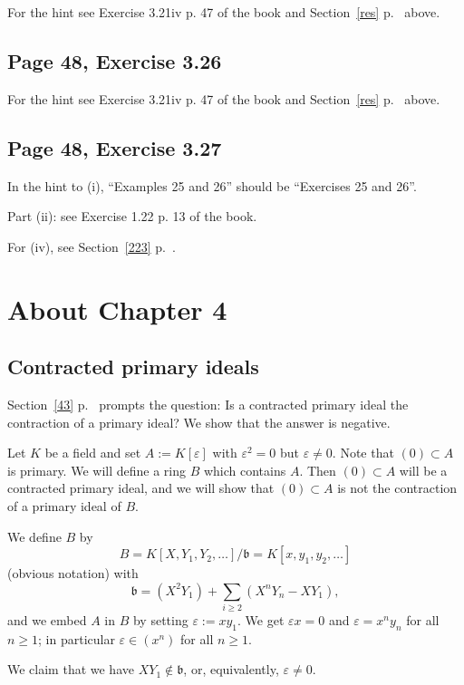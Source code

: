 \documentclass[parskip=half,fontsize=12pt]{scrartcl}%
\begin{document}
For the hint see Exercise 3.21iv p. 47 of the book and Section~\ref{res} p.~\pageref{res} above.

\subsection{Page 48, Exercise 3.26}%

For the hint see Exercise 3.21iv p. 47 of the book and Section~\ref{res} p.~\pageref{res} above.

\subsection{Page 48, Exercise 3.27}%

In the hint to (i), ``Examples 25 and 26'' should be ``Exercises 25 and 26''. 

Part (ii): see Exercise 1.22 p. 13 of the book. 

For (iv), see Section~\ref{223} p.~\pageref{223}.

\section{About Chapter 4}%

\subsection{Contracted primary ideals}\label{cpi}%

Section~\ref{43} p.~\pageref{43} prompts the question: Is a contracted primary ideal the contraction of a primary ideal? We show that the answer is negative.

Let $K$ be a field and set $A:=K[\varepsilon]$ with $\varepsilon^2=0$ but $\varepsilon\ne0$. Note that $(0)\subset A$ is primary. We will define a ring $B$ which contains $A$. Then $(0)\subset A$ will be a contracted primary ideal, and we will show that $(0)\subset A$ is not the contraction of a primary ideal of $B$. 

We define $B$ by 
$$
B=K[X,Y_1,Y_2,\dots]/\mathfrak b=K[x,y_1,y_2,\dots]
$$ 
(obvious notation) with 
$$
\mathfrak b=(X^2Y_1)+\sum_{i\ge2}(X^nY_n-XY_1),
$$
and we embed $A$ in $B$ by setting $\varepsilon:=xy_1$. We get $\varepsilon x=0$ and $\varepsilon=x^ny_n$ for all $n\ge1$; in particular $\varepsilon\in(x^n)$ for all $n\ge1$.

We claim that we have $XY_1\notin\mathfrak b$, or, equivalently, $\varepsilon\ne0$.
\end{document}
